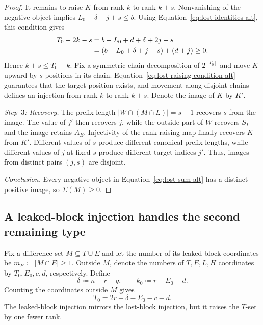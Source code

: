 \documentclass[11pt]{article}
\begin{document}
\begin{proof}
It remains to raise $K$ from rank $k$ to rank $k+s$.
Nonvanishing of the negative object implies ${L_0-\delta-j+s\leq b}$.
Using Equation~\eqref{eq:lost-identities-alt}, this condition gives
\begin{align}
T_0-2k-s
&=b-L_0+d+\delta+2j-s\notag\\
&=(b-L_0+\delta+j-s)+(d+j)\geq0.
\label{eq:lost-raising-condition-alt}
\end{align}
Hence ${k+s\leq T_0-k}$.
Fix a symmetric-chain decomposition of $2^{[T_0]}$ and move $K$ upward by $s$ positions in its chain.
Equation~\eqref{eq:lost-raising-condition-alt} guarantees that the target position exists, and movement along disjoint chains defines an injection from rank $k$ to rank $k+s$.
Denote the image of $K$ by $K'$.

\emph{Step~$3$: Recovery.}
The prefix length ${|W\cap(M\cap L)|=s-1}$ recovers $s$ from the image.
The value of $j'$ then recovers $j$, while the outside part of $W$ recovers $S_L$ and the image retains $A_E$.
Injectivity of the rank-raising map finally recovers $K$ from $K'$.
Different values of $s$ produce different canonical prefix lengths, while different values of $j$ at fixed $s$ produce different target indices $j'$.
Thus, images from distinct pairs $(j,s)$ are disjoint.

\emph{Conclusion.}
Every negative object in Equation~\eqref{eq:lost-sum-alt} has a distinct positive image, so ${\Sigma(M)\geq0}$.
\end{proof}

    \subsection{A leaked-block injection handles the second remaining type}\label{subsec:leaked-injection}

Fix a difference set ${M\subseteq T\cup E}$ and let the number of its leaked-block coordinates be ${m_E\coloneqq|M\cap E|\geq1}$.
Outside $M$, denote the numbers of $T,E,L,H$ coordinates by $T_0,E_0,c,d$, respectively.
Define
\begin{equation*}
\delta\coloneqq n-r-q,
\qquad
k_0\coloneqq r-E_0-d.
\end{equation*}
Counting the coordinates outside $M$ gives
\begin{equation}
T_0=2r+\delta-E_0-c-d.
\label{eq:leaked-identity-alt}
\end{equation}
The leaked-block injection mirrors the lost-block injection, but it raises the $T$-set by one fewer rank.
\end{document}
